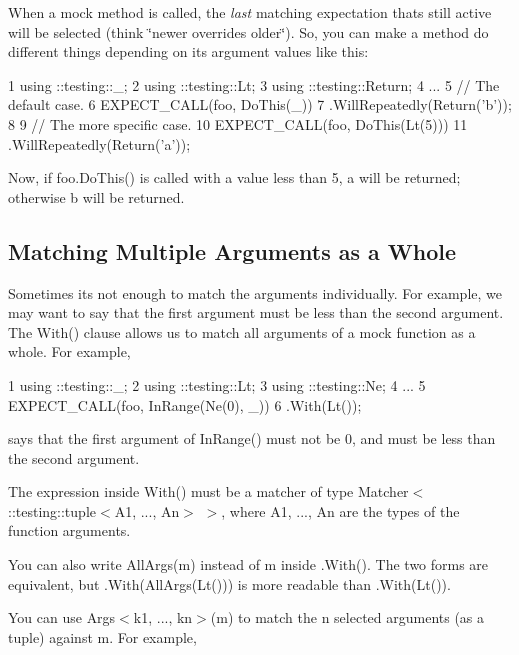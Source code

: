When a mock method is called, the {\itshape last} matching expectation that\textquotesingle{}s still active will be selected (think \char`\"{}newer overrides older\char`\"{}). So, you can make a method do different things depending on its argument values like this\+:


\begin{DoxyCode}
1 using ::testing::\_;
2 using ::testing::Lt;
3 using ::testing::Return;
4 ...
5   // The default case.
6   EXPECT\_CALL(foo, DoThis(\_))
7       .WillRepeatedly(Return('b'));
8 
9   // The more specific case.
10   EXPECT\_CALL(foo, DoThis(Lt(5)))
11       .WillRepeatedly(Return('a'));
\end{DoxyCode}


Now, if {\ttfamily foo.\+Do\+This()} is called with a value less than 5, {\ttfamily \textquotesingle{}a\textquotesingle{}} will be returned; otherwise {\ttfamily \textquotesingle{}b\textquotesingle{}} will be returned.

\subsection*{Matching Multiple Arguments as a Whole}

Sometimes it\textquotesingle{}s not enough to match the arguments individually. For example, we may want to say that the first argument must be less than the second argument. The {\ttfamily With()} clause allows us to match all arguments of a mock function as a whole. For example,


\begin{DoxyCode}
1 using ::testing::\_;
2 using ::testing::Lt;
3 using ::testing::Ne;
4 ...
5   EXPECT\_CALL(foo, InRange(Ne(0), \_))
6       .With(Lt());
\end{DoxyCode}


says that the first argument of {\ttfamily In\+Range()} must not be 0, and must be less than the second argument.

The expression inside {\ttfamily With()} must be a matcher of type {\ttfamily Matcher$<$ \+::testing\+::tuple$<$A1, ..., An$>$ $>$}, where {\ttfamily A1}, ..., {\ttfamily An} are the types of the function arguments.

You can also write {\ttfamily All\+Args(m)} instead of {\ttfamily m} inside {\ttfamily .With()}. The two forms are equivalent, but {\ttfamily .With(All\+Args(\+Lt()))} is more readable than {\ttfamily .With(\+Lt())}.

You can use {\ttfamily Args$<$k1, ..., kn$>$(m)} to match the {\ttfamily n} selected arguments (as a tuple) against {\ttfamily m}. For example,


